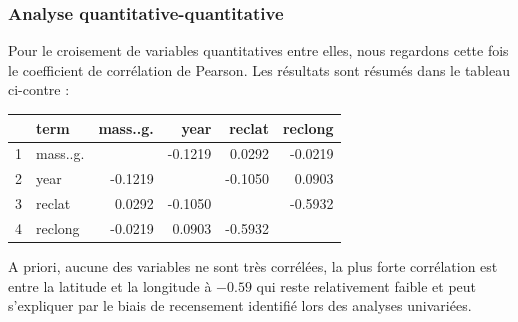 \documentclass[12pt]{article}
\begin{document}
\subsubsection*{Analyse quantitative-quantitative}
Pour le croisement de variables quantitatives entre elles, nous regardons cette fois le coefficient de corrélation de Pearson. Les résultats sont résumés dans le tableau ci-contre :
\begin{table}[H]
\centering
\begin{tabular}{rlrrrr}
  \hline
 & term & mass..g. & year & reclat & reclong \\ 
  \hline
1 & mass..g. &  & -0.1219 & 0.0292 & -0.0219 \\ 
  2 & year & -0.1219 &  & -0.1050 & 0.0903 \\ 
  3 & reclat & 0.0292 & -0.1050 &  & -0.5932 \\ 
  4 & reclong & -0.0219 & 0.0903 & -0.5932 &  \\ 
   \hline
\end{tabular}
\end{table}
A priori, aucune des variables ne sont très corrélées, la plus forte corrélation est entre la latitude et la longitude à $-0.59$ qui reste relativement faible et peut s'expliquer par le biais de recensement identifié lors des analyses univariées.
\end{document}
